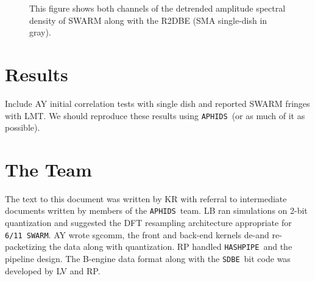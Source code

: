 \documentclass[11pt,preprint]{aastex}
\newcommand{\SWARM}[1]{\texttt{#1\,SWARM}}
\newcommand{\SDBE}{\texttt{SDBE}}
\newcommand{\APHIDS}{\texttt{APHIDS}}
\newcommand{\HASHPIPE}{\texttt{HASHPIPE}}
\begin{document}
\begin{figure}[H]
\caption{This figure shows both channels of the detrended amplitude spectral density of SWARM along with the 
R2DBE (SMA single-dish in gray).}
\label{fig:swarm_amp_spec}
\end{figure}

\section{Results}

Include AY initial correlation tests with single dish and reported SWARM fringes with LMT.
We should reproduce these results using \APHIDS\ (or as much of it as possible).

\section{The Team}
The text to this document was written by KR with referral to intermediate documents written by
members of the \APHIDS\ team.  LB ran simulations on 2-bit quantization and suggested the DFT resampling 
architecture appropriate for \SWARM{6/11}. AY wrote sgcomm, the front and back-end kernels de-and re-packetizing 
the data along with quantization. RP handled \HASHPIPE\, and the pipeline design.  The B-engine data format along 
with the \SDBE\, bit code was developed by LV and RP.

\acknowledgments 
\clearpage


\end{document}
